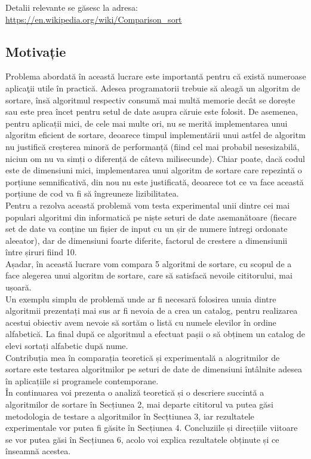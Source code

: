 \documentclass[12pt]{article}
\begin{document}
Detalii relevante se găsesc la adresa:\\
\indent\url{https://en.wikipedia.org/wiki/Comparison_sort}

\subsection{Motivație}
Problema abordată în această lucrare este importantă pentru că există numeroase aplicaţii utile în practică. Adesea programatorii trebuie să aleagă un algoritm de sortare, însă algoritmul respectiv consumă mai multă memorie decât se dorește sau este prea încet pentru setul de date asupra căruie este folosit. De asemenea, pentru aplicații mici, de cele mai multe ori, nu se merită implementarea unui algoritm eficient de sortare, deoarece timpul implementării unui astfel de algoritm nu justifică creșterea minoră de performanță (fiind cel mai probabil nesesizabilă, niciun om nu va simți o diferență de câteva milisecunde). Chiar poate, dacă codul este de dimensiuni mici, implementarea unui algoritm de sortare care repezintă o porțiune semnificativă, din nou nu este justificată, deoarece tot ce va face această porțiune de cod va fi să îngreuneze lizibilitatea.\\
\indent Pentru a rezolva această problemă vom testa experimental unii dintre cei mai populari algoritmi din informatică pe niște seturi de date asemanătoare (fiecare set de date va conține un fișier de input cu un șir de numere întregi ordonate aleeator), dar de dimensiuni foarte diferite, factorul de crestere a dimensiunii între șiruri fiind 10.\\
\indent Așadar, în această lucrare vom compara 5 algoritmi de sortare, cu scopul de a face alegerea unui algoritm de sortare, care să satisfacă nevoile cititorului, mai ușoară.\\
\indent Un exemplu simplu de problemă unde ar fi necesară folosirea unuia dintre algoritmii prezentați mai sus ar fi nevoia de a crea un catalog, pentru realizarea acestui obiectiv avem nevoie să sortăm o listă cu numele elevilor în ordine alfabetică. La final după ce algoritmul a efectuat pașii o să obținem un catalog de elevi sortați alfabetic după nume.\\
\indent Contribuția mea în comparația teoretică și experimentală a alogritmilor de sortare este testarea algoritmilor pe seturi de date de dimensiuni întâlnite adesea în aplicațiile si programele contemporane.\\
\indent În continuarea voi prezenta o analiză teoretică și o descriere succintă a algoritmilor de sortare în Secțiunea 2, mai departe cititorul va putea găsi metodologia de testare a algoritmilor în Secțtiunea 3, iar rezultatele experimentale vor putea fi găsite în Secțiunea 4. Concluziile și direcțiile viitoare se vor putea găsi în Secțiunea 6, acolo voi explica rezultatele obținute și ce înseamnă acestea.
\end{document}
